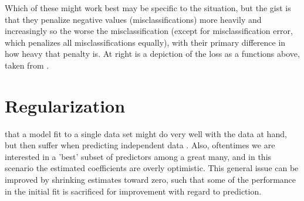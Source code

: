 \documentclass[english,nohyper,titlepage]{tufte-handout}
\begin{document}
\vspace{.25cm}
Which of these might work best may be specific to the situation, but the gist is that they penalize negative values (misclassifications) more heavily and increasingly so the worse the misclassification (except for misclassification error, which penalizes all misclassifications equally), with their primary difference in how heavy that penalty is.  At right is a depiction of the loss as a functions above, taken from \citet{hastie_elements_2009}.











\part{Regularization}
 that a model fit to a single data set might do very well with the data at hand, but then suffer when predicting independent data .  Also, oftentimes we are interested in a 'best' subset of predictors among a great many, and in this scenario the estimated coefficients are overly optimistic.  This general issue can be improved by shrinking estimates toward zero, such that some of the performance in the initial fit is sacrificed for improvement with regard to prediction.
\end{document}
